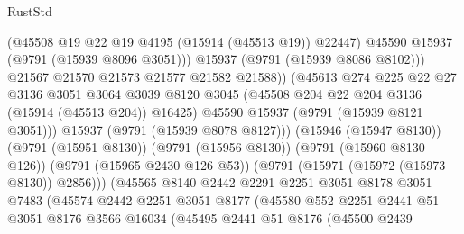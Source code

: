 \begin{lexlean}{RustStd}
\begin{coremodule}
                                    (@45508 @19 @22 @19 @4195 (@15914 (@45513 @19)) @22447)
                                    @45590
                                    @15937
                                    (@9791 (@15939 @8096 @3051)))
                                  @15937
                                  (@9791 (@15939 @8086 @8102)))
                                @21567
                                @21570
                                @21573
                                @21577
                                @21582
                                @21588))
                            (@45613
                              @274
                              @225
                              @22
                              @27
                              @3136
                              @3051
                              @3064
                              @3039
                              @8120
                              @3045
                              (@45508 @204 @22 @204 @3136 (@15914 (@45513 @204)) @16425)
                              @45590
                              @15937
                              (@9791 (@15939 @8121 @3051)))
                            @15937
                            (@9791 (@15939 @8078 @8127)))
                          (@15946 (@15947 @8130))
                          (@9791 (@15951 @8130))
                          (@9791 (@15956 @8130))
                          (@9791 (@15960 @8130 @126))
                          (@9791 (@15965 @2430 @126 @53))
                          (@9791 (@15971 (@15972 (@15973 @8130)) @2856)))
                        (@45565
                          @8140
                          @2442
                          @2291
                          @2251
                          @3051
                          @8178
                          @3051
                          @7483
                          (@45574
                            @2442
                            @2251
                            @3051
                            @8177
                            (@45580
                              @552
                              @2251
                              @2441
                              @51
                              @3051
                              @8176
                              @3566
                              @16034
                              (@45495
                                @2441
                                @51
                                @8176
                                (@45500
                                  @2439

\end{coremodule}
\end{lexlean}
